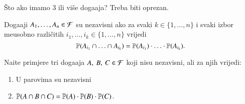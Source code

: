 \v Sto ako imamo 3 ili vi\v se doga\dj aja?
Treba biti oprezan.

\begin{defn}    \label{defn:6.3-1}
    Doga\dj aji $A_1, \ldots, A_n \in \mathcal{F}$ su nezavisni ako za svaki $k \in \{1, \ldots, n\}$ i svaki izbor me\dj usobno razli\v citih $i_1, \ldots, i_k \in \{1, \ldots, n\}$ vrijedi
    \begin{equation*}
        \mathbb{P}({A_{i_1} \cap \ldots  \cap A_{i_k}}) = \mathbb{P}({A_{i_1}}) \cdot \ldots \cdot \mathbb{P}({A_{i_k}}).
    \end{equation*}    
\end{defn}

\begin{zad} \label{zad:6.4}
    Na\dj ite primjere tri doga\dj aja $A, \: B, \: C \in \mathcal{F}$ koji nisu nezavisni, ali za njih vrijedi:
    \begin{enumerate}[label=(\roman*)]
        \item U parovima su nezavisni
        \item $\mathbb{P}({A \cap B \cap C}) = \mathbb{P}({A}) \cdot \mathbb{P}({B}) \cdot \mathbb{P}({C})$.
    \end{enumerate}
\end{zad}

